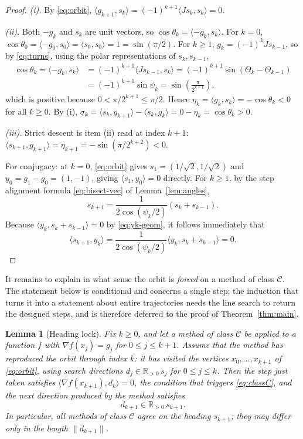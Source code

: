 \documentclass[11pt]{article}
\newtheorem{lemma}[theorem]{Lemma}
\newcommand{\R}{\mathbb{R}}
\newcommand{\ip}[2]{\langle #1,#2\rangle}
\begin{document}
\begin{proof}
\emph{(i).} By \eqref{eq:orbit},
$\ip{g_{k+1}}{s_k} = (-1)^{k+1}\ip{Js_k}{s_k} = 0$.

\emph{(ii).} Both $-g_k$ and $s_k$ are unit vectors, so $\cos\theta_k = \ip{-g_k}{s_k}$.
For $k = 0$, $\cos\theta_0 = \ip{-g_0}{s_0} = \ip{s_0}{s_0} = 1 = \sin(\pi/2)$.
For $k \ge 1$, $g_k = (-1)^k J s_{k-1}$, so by \eqref{eq:turns}, using the polar representations of $s_k, s_{k-1}$,
\begin{align*}
\cos\theta_k = \ip{-g_k}{s_k}
&= (-1)^{k+1}\ip{Js_{k-1}}{s_k} = (-1)^{k+1}\sin(\Theta_k - \Theta_{k-1})\\
&= (-1)^{k+1}\sin\psi_k = \sin\left(\frac{\pi}{2^{k+1}}\right),
\end{align*}
which is positive because $0 < \pi/2^{k+1} \le \pi/2$. Hence $\eta_k = \ip{g_k}{s_k} = -\cos\theta_k < 0$ for all $k \ge 0$.
By (i), $\sigma_k = \ip{s_k}{g_{k+1}} - \ip{s_k}{g_k} = 0 - \eta_k = \cos\theta_k > 0$.

\emph{(iii).} Strict descent is item (ii) read at index $k+1$: $\ip{s_{k+1}}{g_{k+1}} = \eta_{k+1} = -\sin(\pi/2^{k+2}) < 0$.

For conjugacy: at $k = 0$, \eqref{eq:orbit} gives $s_1 = (1/\sqrt2, 1/\sqrt2)$ and $y_0 = g_1 - g_0 = (1, -1)$, giving $\ip{s_1}{y_0} = 0$ directly.
For $k \ge 1$, by the step alignment formula \eqref{eq:bisect-vec} of Lemma~\ref{lem:angles},
\[
s_{k+1} = \frac{1}{2\cos(\psi_k/2)}(s_k + s_{k-1}).
\]
Because $\ip{y_k}{s_k + s_{k-1}} = 0$ by \eqref{eq:yk-geom}, it follows immediately that
\[
\ip{s_{k+1}}{y_k} = \frac{1}{2\cos(\psi_k/2)}\ip{y_k}{s_k + s_{k-1}} = 0.
\]
\end{proof}

It remains to explain in what sense the orbit is \emph{forced} on a method of class $\mathcal C$. The statement below is conditional and concerns a single step; the induction that turns it into a statement about entire trajectories needs the line search to return the designed steps, and is therefore deferred to the proof of Theorem~\ref{thm:main}.

\begin{lemma}[Heading lock]
\label{lem:heading}
Fix $k \ge 0$, and let a method of class $\mathcal C$ be applied to a function $f$ with $\nabla f(x_j) = g_j$ for $0 \le j \le k+1$. Assume that the method has reproduced the orbit through index $k$: it has visited the vertices $x_0, \dots, x_{k+1}$ of \eqref{eq:orbit}, using search directions $d_j \in \R_{>0}\,s_j$ for $0 \le j \le k$. Then the step just taken satisfies $\ip{\nabla f(x_{k+1})}{d_k} = 0$, the condition that triggers \eqref{eq:classC}, and the next direction produced by the method satisfies
\[
d_{k+1} \in \R_{>0}\,s_{k+1}.
\]
In particular, all methods of class $\mathcal C$ agree on the heading $s_{k+1}$; they may differ only in the length $\|d_{k+1}\|$.
\end{lemma}
\end{document}
